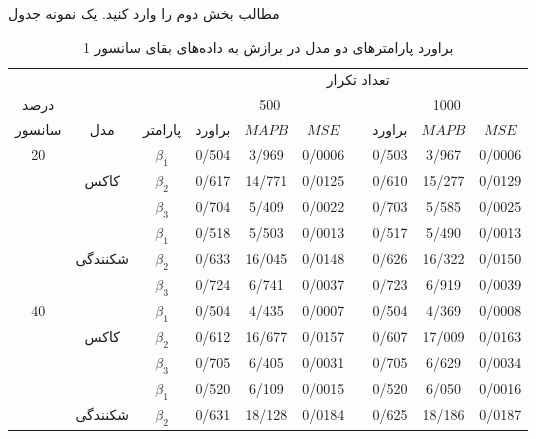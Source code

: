 مطالب بخش دوم را وارد کنید. یک نمونه جدول
\begin{table}
\caption{براورد پارامترهای دو مدل در برازش به داده‌های بقای سانسور 1 \label{TabAa31}}%
\centering
\begin{tabular}{cccccccccc}
\\
\hline 
		&	&      &     \multicolumn{7}{c}{تعداد تکرار}\\
\cline{4-10}
درصد		&	&      &     \multicolumn{3}{c}{500} & & \multicolumn{3}{c}{1000}\\
\cline{4-6} \cline{8-10}
سانسور & مدل & پارامتر &  براورد & $MAPB$ & $MSE$ & & براورد & $MAPB$ & $MSE$ \\
\hline
\multirow{6}{*}{20} &
	& $\beta_1$ & 0/504 & 3/969 & 0/0006 & & 0/503 & 3/967 & 0/0006 \\
&کاکس& $\beta_2$ & 0/617 & 14/771 & 0/0125 & & 0/610 & 15/277 & 0/0129 \\
\vspace{2mm}
&	& $\beta_3$ & 0/704 & 5/409 & 0/0022 & & 0/703 & 5/585 & 0/0025 \\
&	& $\beta_1$ & 0/518 & 5/503 & 0/0013 & & 0/517 & 5/490 & 0/0013 \\
&شکنندگی & $\beta_2$ & 0/633 & 16/045 & 0/0148 & & 0/626 & 16/322 & 0/0150  \\
\vspace{2mm}
&	& $\beta_3$ & 0/724 & 6/741 & 0/0037 & & 0/723 & 6/919 & 0/0039 \\
\multirow{6}{*}{40} &
	& $\beta_1$ & 0/504 & 4/435 & 0/0007 & & 0/504 & 4/369 & 0/0008 \\
&کاکس& $\beta_2$ & 0/612 & 16/677 & 0/0157 & & 0/607 & 17/009 & 0/0163 \\
\vspace{2mm}
&	& $\beta_3$ & 0/705 & 6/405 & 0/0031 & & 0/705 & 6/629 & 0/0034 \\
&	& $\beta_1$ & 0/520 & 6/109 & 0/0015 & & 0/520 & 6/050 & 0/0016 \\
&شکنندگی & $\beta_2$ & 0/631 & 18/128 & 0/0184 & & 0/625 & 18/186 & 0/0187 \\
\hline
\end{tabular}
\end{table}